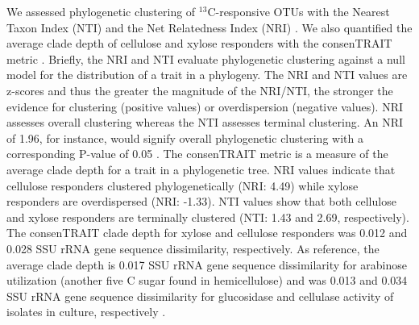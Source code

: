 We assessed phylogenetic clustering of $^{13}$C-responsive OTUs with the
Nearest Taxon Index (NTI) and the Net Relatedness Index (NRI)
\citep{Webb2000}. We also quantified the average clade depth of cellulose and
xylose responders with the consenTRAIT metric \citep{Martiny2013}. Briefly, the
NRI and NTI evaluate phylogenetic clustering against a null model for the
distribution of a trait in a phylogeny. The NRI and NTI values are z-scores and
thus the greater the magnitude of the NRI/NTI, the stronger the evidence for
clustering (positive values) or overdispersion (negative values). NRI assesses
overall clustering whereas the NTI assesses terminal clustering. An NRI of
1.96, for instance, would signify overall phylogenetic clustering with
a corresponding P-value of 0.05 \citep{Evans2014a}. The consenTRAIT metric is
a measure of the average clade depth for a trait in a phylogenetic tree. NRI
values indicate that cellulose responders clustered phylogenetically (NRI:
4.49) while xylose responders are overdispersed (NRI: -1.33). NTI values show
that both cellulose and xylose responders are terminally clustered (NTI: 1.43
and 2.69, respectively). The consenTRAIT clade depth for xylose and cellulose
responders was 0.012 and 0.028 SSU rRNA gene sequence dissimilarity,
respectively. As reference, the average clade depth is 0.017 SSU rRNA gene
sequence dissimilarity for arabinose utilization (another five C sugar found in
hemicellulose) and was 0.013 and 0.034 SSU rRNA gene sequence dissimilarity for
glucosidase and cellulase activity of isolates in culture, respectively
\citep{Martiny2013,Berlemont2013}.
